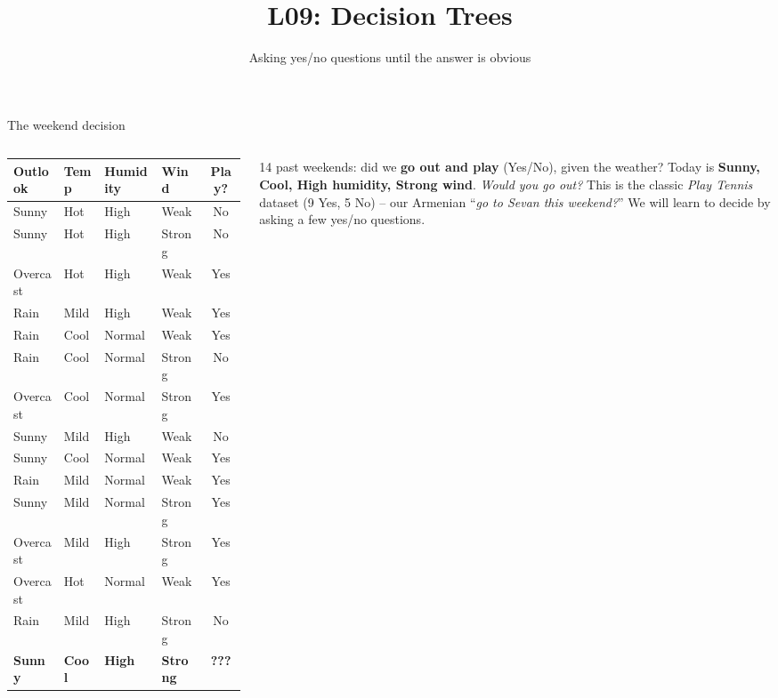 \documentclass[aspectratio=169]{beamer}
\title{L09: Decision Trees}
\subtitle{Asking yes/no questions until the answer is obvious}
\date{}
\begin{document}
\begin{frame}{The weekend decision}
  \begin{columns}[T]
    \scriptsize
    \setlength{\tabcolsep}{4pt}\renewcommand{\arraystretch}{1.02}
    \begin{tabular}{l l l l | c}
      \textbf{Outlook} & \textbf{Temp} & \textbf{Humidity} & \textbf{Wind} & \textbf{Play?} \\
      \hline
      Sunny & Hot & High & Weak & \textcolor{armred}{No} \\
      Sunny & Hot & High & Strong & \textcolor{armred}{No} \\
      Overcast & Hot & High & Weak & \textcolor{paramgreen}{Yes} \\
      Rain & Mild & High & Weak & \textcolor{paramgreen}{Yes} \\
      Rain & Cool & Normal & Weak & \textcolor{paramgreen}{Yes} \\
      Rain & Cool & Normal & Strong & \textcolor{armred}{No} \\
      Overcast & Cool & Normal & Strong & \textcolor{paramgreen}{Yes} \\
      Sunny & Mild & High & Weak & \textcolor{armred}{No} \\
      Sunny & Cool & Normal & Weak & \textcolor{paramgreen}{Yes} \\
      Rain & Mild & Normal & Weak & \textcolor{paramgreen}{Yes} \\
      Sunny & Mild & Normal & Strong & \textcolor{paramgreen}{Yes} \\
      Overcast & Mild & High & Strong & \textcolor{paramgreen}{Yes} \\
      Overcast & Hot & Normal & Weak & \textcolor{paramgreen}{Yes} \\
      Rain & Mild & High & Strong & \textcolor{armred}{No} \\
      \hline
      \textbf{Sunny} & \textbf{Cool} & \textbf{High} & \textbf{Strong} & \textbf{???} \\
    \end{tabular}
    14 past weekends: did we \textbf{go out and play} (Yes/No), given the weather?
    \vskip 4pt
    Today is \textbf{Sunny, Cool, High humidity, Strong wind}.
    \vskip 4pt
    \emph{Would you go out?}
    \vskip 6pt
    \footnotesize This is the classic \emph{Play Tennis} dataset (9 Yes, 5 No) -- our
    Armenian ``\emph{go to Sevan this weekend?}'' We will learn to decide by asking a
    few yes/no questions.
  \end{columns}
\end{frame}
\end{document}
